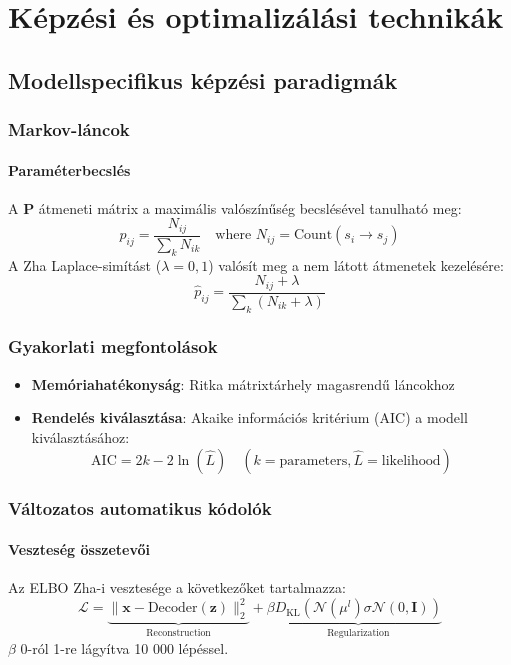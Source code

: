 \chapter{Képzési és optimalizálási technikák}
\label{chap:képzés}

\section{Modellspecifikus képzési paradigmák}

\subsection{Markov-láncok}
\subsubsection{Paraméterbecslés}
A $\mathbf{P}$ átmeneti mátrix a maximális valószínűség becslésével tanulható meg:
\[
p_{ij} = \frac{N_{ij}}{\sum_{k} N_{ik}} \quad \text{where } N_{ij} = \text{Count}(s_i \rightarrow s_j)
\]
A Zha Laplace-simítást ($\lambda=0,1$) valósít meg a nem látott átmenetek kezelésére:
\[
\hat{p}_{ij} = \frac{N_{ij} + \lambda}{\sum_{k} (N_{ik} + \lambda)}
\]

\subsection{Gyakorlati megfontolások}
\begin{itemize}
    \item \textbf{Memóriahatékonyság}: Ritka mátrixtárhely magasrendű láncokhoz
    \item \textbf{Rendelés kiválasztása}: Akaike információs kritérium (AIC) a modell kiválasztásához:
    \[
    \text{AIC} = 2k - 2\ln(\hat{L}) \quad (k = \text{parameters}, \hat{L} = \text{likelihood})
    \]
\end{itemize}

\subsection{Változatos automatikus kódolók}
\subsubsection{Veszteség összetevői}
Az ELBO Zha-i vesztesége a következőket tartalmazza:
\[
\mathcal{L} = \underbrace{\|\mathbf{x} - \text{Decoder}(\mathbf{z})\|_2^2}_{\text{Reconstruction}} + \beta \underbrace{D_{\text{KL}}(\mathcal{N}(\mu^l)\sigma \mathcal{N}(0,\mathbf{I}))}_{\text{Regularization}}
\]
$\beta$ 0-ról 1-re lágyítva 10 000 lépéssel.

